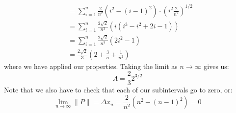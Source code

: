 \begin{itemize}
\begin{example}
\begin{align}
            &= \sum_{i=1}^n \frac{2}{n^2}\left(i^2-(i-1)^2\right) \cdot \left(i^2 \frac{2}{n^2}\right)^{1/2} \\
            &= \sum_{i=1}^n \frac{2\sqrt{2}}{n^3}(i(i^3-i^2+2i-1)) \\ 
            &= \sum_{i=1}^n \frac{2\sqrt{2}}{n^3}(2i^2-1) \\ 
            &= \frac{2\sqrt{2}}{3} \left(2+\frac{3}{n}+\frac{1}{n^2}\right)
            \label{eq:}
        \end{align}
        where we have applied our properties. Taking the limit as $n\to\infty$ gives us:
        \begin{equation}
            A = \frac{2}{3}2^{3/2}
            \label{eq:}
        \end{equation}
        Note that we also have to check that each of our subintervals go to zero, or:
        \begin{equation}
            \lim_{n\to \infty} \lVert P \rVert = \Delta x_n = \frac{2}{n^2}\left(n^2-(n-1)^2\right) = 0
            \label{eq:}
        \end{equation}
        
    \end{example}
\end{itemize}